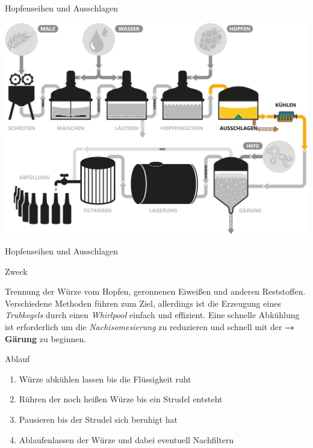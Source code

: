 \documentclass[9pt, ngerman]{beamer}
\newcommand{\forward}[1]{\textbf{→\,#1}}
\begin{document}
\begin{frame}{Hopfenseihen und Ausschlagen}
  \begin{center}
    \vspace{0.5cm}
    \includegraphics[width=\textwidth]{pdfs/prozess-ausschlagen.pdf}
  \end{center}
\end{frame}
\begin{frame}{Hopfenseihen und Ausschlagen}
  \begin{block}{Zweck}
    \vspace{0.5em}

    Trennung der Würze vom Hopfen, geronnenen Eiweißen und anderen
    Reststoffen. Verschiedene Methoden führen zum Ziel, allerdings ist die
    Erzeugung eines \emph{Trubkegels} durch einen \emph{Whirlpool} einfach und
    effizient. Eine schnelle Abkühlung ist erforderlich um die
    \emph{Nachisomesierung} zu reduzieren und schnell mit der \forward{Gärung}
    zu beginnen.

  \end{block}

  \begin{block}{Ablauf}
    \begin{enumerate}
      \item Würze abkühlen lassen bis die Flüssigkeit ruht
      \item Rühren der noch heißen Würze bis ein Strudel entsteht
      \item Pausieren bis der Strudel sich beruhigt hat
      \item Ablaufenlassen der Würze und dabei eventuell Nachfiltern
    \end{enumerate}
  \end{block}
\end{frame}
\end{document}
